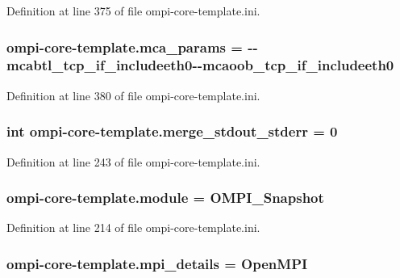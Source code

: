 Definition at line 375 of file ompi-\/core-\/template.\-ini.

\hypertarget{namespaceompi-core-template_a3972657d18b13fbec48e9fc366ff07f0}{
\subsubsection[{mca\-\_\-params}]{\setlength{\rightskip}{0pt plus 5cm}ompi-\/core-\/template.\-mca\-\_\-params = -\/-\/mcabtl\-\_\-tcp\-\_\-if\-\_\-includeeth0-\/-\/mcaoob\-\_\-tcp\-\_\-if\-\_\-includeeth0}}\label{namespaceompi-core-template_a3972657d18b13fbec48e9fc366ff07f0}


Definition at line 380 of file ompi-\/core-\/template.\-ini.

\hypertarget{namespaceompi-core-template_aa5933d429ca66125d5d2ae8d0c6a1228}{
\subsubsection[{merge\-\_\-stdout\-\_\-stderr}]{\setlength{\rightskip}{0pt plus 5cm}int ompi-\/core-\/template.\-merge\-\_\-stdout\-\_\-stderr = 0}}\label{namespaceompi-core-template_aa5933d429ca66125d5d2ae8d0c6a1228}


Definition at line 243 of file ompi-\/core-\/template.\-ini.

\hypertarget{namespaceompi-core-template_a0740abf47d69d62e964af74e156b0e88}{
\subsubsection[{module}]{\setlength{\rightskip}{0pt plus 5cm}ompi-\/core-\/template.\-module = O\-M\-P\-I\-\_\-\-Snapshot}}\label{namespaceompi-core-template_a0740abf47d69d62e964af74e156b0e88}


Definition at line 214 of file ompi-\/core-\/template.\-ini.

\hypertarget{namespaceompi-core-template_ae991e705825a3a258264eba6c0aecc15}{
\subsubsection[{mpi\-\_\-details}]{\setlength{\rightskip}{0pt plus 5cm}ompi-\/core-\/template.\-mpi\-\_\-details = Open\-M\-P\-I}}\label{namespaceompi-core-template_ae991e705825a3a258264eba6c0aecc15}


